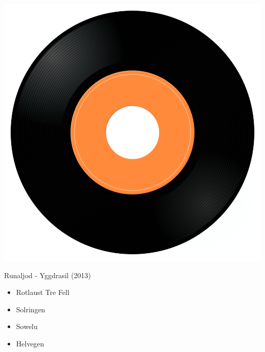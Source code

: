 \begin{minipage}[t]{0.25\textwidth}
\captionsetup{type=figure}
\includegraphics[width=\textwidth]{Images/cover.png}
\caption*{Runaljod - Yggdrasil (2013)}
\end{minipage}
\begin{minipage}[t]{0.25\textwidth}\vspace{0pt}
\begin{itemize}[nosep,leftmargin=1em,labelwidth=*,align=left]
	\setlength{\itemsep}{0pt}
	\item Rotlaust Tre Fell
	\item Solringen
	\item Sowelu
	\item Helvegen
\end{itemize}
\end{minipage}

